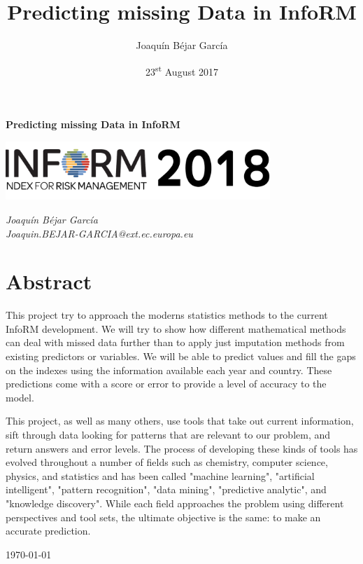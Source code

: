 \documentclass[a4project, twocolumn]{article}
\title{Predicting missing Data in InfoRM}
\author{Joaqu\'in B\'ejar Garc\'ia}
\date{23\textsuperscript{st} August 2017}
\begin{document}
\nocite{*}

\begin{titlepage}
	\centering

	\vspace{1.5cm}
	{\huge\bfseries Predicting missing Data in InfoRM \par}
	\vspace{1.5cm}
	\includegraphics[width=0.75\textwidth]{INFORM_banner.png}\par\vspace{1cm}
	\vfill
	{\Large\itshape 
	Joaquín Béjar García \\
	{\selectfont
	\small{Joaquin.BEJAR-GARCIA@ext.ec.europa.eu}
	}
	\par}
\section{Abstract}
\justify
This project try to approach the moderns statistics methods to the current InfoRM development. We will try to show how different mathematical methods can deal with missed data further than to apply just imputation methods from existing predictors or variables. We will be able to predict values and fill the gaps on the indexes using the information available each year and country. These predictions come with a score or error to provide a level of accuracy to the model.

This project, as well as many others, use tools that take out current information, sift through data looking for patterns that are relevant to our problem, and return answers and error levels. The process of developing these kinds of tools has evolved throughout a number of fields such as chemistry, computer science, physics, and statistics and has been called "machine learning", "artificial intelligent", "pattern recognition", "data mining", "predictive analytic", and "knowledge discovery". While each field approaches the problem using different perspectives and tool sets, the ultimate objective is the same: to make an accurate prediction.

	\vfill

	{\large \today\par}
\end{titlepage}
\thispagestyle{plain}
\clearpage
\end{document}
